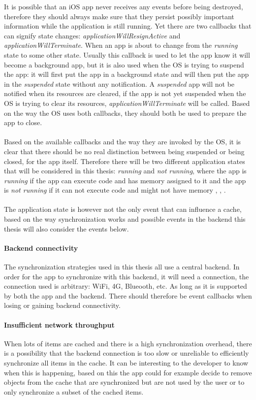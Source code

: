 \documentclass[pdftex,a4paper,12pt,twoside]{report}
\begin{document}
It is possible that an iOS app never receives any events before being destroyed, therefore they should always make sure that they persist possibly important information while the application is still running. Yet there are two callbacks that can signify state changes: \emph{applicationWillResignActive} and \emph{applicationWillTerminate}. When an app is about to change from the \emph{running} state to some other state. Usually this callback is used to let the app know it will become a background app, but it is also used when the OS is trying to suspend the app: it will first put the app in a background state and will then put the app in the \emph{suspended} state without any notification. A \emph{suspended} app will not be notified when its resources are cleared, if the app is not yet suspended when the OS is trying to clear its resources, \emph{applicationWillTerminate} will be called. Based on the way the OS uses both callbacks, they should both be used to prepare the app to close.
\\\\
Based on the available callbacks and the way they are invoked by the OS, it is clear that there should be no real distinction between being suspended or being closed, for the app itself. Therefore there will be two different application states that will be considered in this thesis: \emph{running} and \emph{not running}, where the app is \emph{running} if the app can execute code and has memory assigned to it and the app is \emph{not running} if it can not execute code and might not have memory \citep{events_android}, \citep{events_uwp}, \citep{events_ios}.
\\\\
The application state is however not the only event that can influence a cache, based on the way synchronization works and possible events in the backend this thesis will also consider the events below.
\paragraph{Backend connectivity} The synchronization strategies used in this thesis all use a central backend. In order for the app to synchronize with this backend, it will need a connection, the connection used is arbitrary: WiFi, 4G, Blueooth, etc. As long as it is supported by both the app and the backend. There should therefore be event callbacks when losing or gaining backend connectivity.
\paragraph{Insufficient network throughput} When lots of items are cached and there is a high synchronization overhead, there is a possibility that the backend connection is too slow or unreliable to efficiently synchronize all items in the cache. It can be interesting to the developer to know when this is happening, based on this the app could for example decide to remove objects from the cache that are synchronized but are not used by the user or to only synchronize a subset of the cached items.
\end{document}
